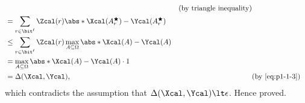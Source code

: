 \begin{answer}[iii]
\begin{align*}
        && (\textrm{by triangle inequality})\\
        &= \sum_{r\in \bit^{\ell}} \Zcal(r) \abs*{\Xcal(A^\bigstar_r)- \Ycal( A^\bigstar_r)} \\
        &\le \sum_{r\in \bit^{\ell}} \Zcal(r) \max_{A\subseteq \Omega}\abs*{\Xcal(A)-\Ycal(A)}\\
        &= \max_{A\subseteq \Omega}\abs*{\Xcal(A)-\Ycal(A)} \cdot 1\\
        &= \Delta(\Xcal, \Ycal), && (\textrm{by \eqref{eq:p1-1-3}})
    \end{align*}
    which contradicts the assumption that $\Delta(\Xcal, \Ycal)\lt \epsilon$. Hence proved.
\end{answer}
